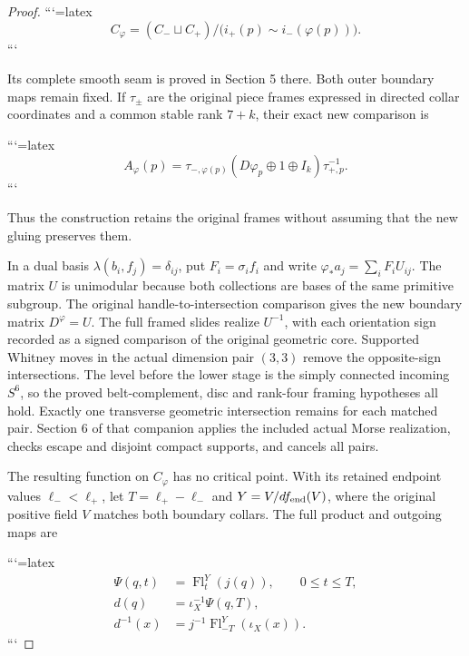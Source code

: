 \begin{proof}
```{=latex}
\begin{equation}
C_\varphi=(C_-\sqcup C_+)/
             \bigl(i_+(p)\sim i_-(\varphi(p))\bigr).
 \label{courseIII:integral-homology-and-sphere-recognition:eq:10.8}
\end{equation}
```


Its complete smooth seam is proved in Section 5 there. Both outer boundary maps remain fixed. If \(\tau_\pm\) are the original piece frames expressed in directed collar coordinates and a common stable rank \(7+k\), their exact new comparison is


```{=latex}
\begin{equation}
A_\varphi(p)=\tau_{-,\varphi(p)}
                (D\varphi_p\oplus1\oplus I_k)\tau_{+,p}^{-1}.
 \label{courseIII:integral-homology-and-sphere-recognition:eq:10.9}
\end{equation}
```


Thus the construction retains the original frames without assuming that the new gluing preserves them.

In a dual basis \(\lambda(b_i,f_j)=\delta_{ij}\), put \(F_i=\sigma_i f_i\) and write \(\varphi_*a_j=\sum_iF_iU_{ij}\). The matrix \(U\) is unimodular because both collections are bases of the same primitive subgroup. The original handle-to-intersection comparison gives the new boundary matrix \(D^\varphi=U\). The full framed slides realize \(U^{-1}\), with each orientation sign recorded as a signed comparison of the original geometric core. Supported Whitney moves in the actual dimension pair \((3,3)\) remove the opposite-sign intersections. The level before the lower stage is the simply connected incoming \(S^6\), so the proved belt-complement, disc and rank-four framing hypotheses all hold. Exactly one transverse geometric intersection remains for each matched pair. Section 6 of that companion applies the included actual Morse realization, checks escape and disjoint compact supports, and cancels all pairs.

The resulting function on \(C_\varphi\) has no critical point. With its retained endpoint values \(\ell_-<\ell_+\), let \(T=\ell_+-\ell_-\) and \(Y=V/df_{\rm end}(V)\), where the original positive field \(V\) matches both boundary collars. The full product and outgoing maps are


```{=latex}
\begin{equation}
\begin{split}
 \Psi(q,t)&=\operatorname{Fl}^{Y}_t(j(q)),\qquad 0\le t\le T,\\
 d(q)&=\iota_X^{-1}\Psi(q,T),\\
 d^{-1}(x)&=j^{-1}\operatorname{Fl}^{Y}_{-T}(\iota_X(x)).
 \end{split}
 \label{courseIII:integral-homology-and-sphere-recognition:eq:10.10}
\end{equation}
```



\end{proof}
